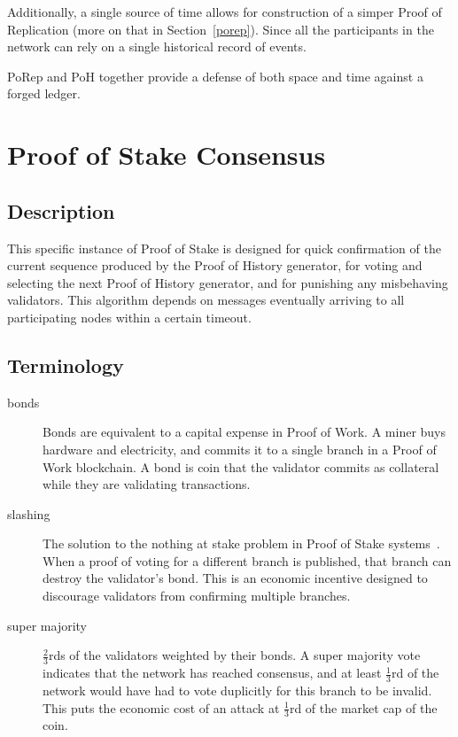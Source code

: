 \documentclass[12pt]{article}
\begin{document}
Additionally, a single source of time allows for construction of a simper Proof of Replication (more on that in Section~\ref{porep}). Since all the participants in the network can rely on a single historical record of events.

PoRep and PoH together provide a defense of both space and time against a forged ledger.


\section{Proof of Stake Consensus}\label{proof_of_stake}
\subsection{Description}
This specific instance of Proof of Stake is designed for quick confirmation of the current sequence produced by the Proof of History generator, for voting and selecting the next Proof of History generator, and for punishing any misbehaving validators. This algorithm depends on messages eventually arriving to all participating nodes within a certain timeout.
\subsection{Terminology}
\begin{description}

\item[bonds]
Bonds are equivalent to a capital expense in Proof of Work. A miner buys hardware and electricity, and commits it to a single branch in a Proof of Work blockchain. A bond is coin that the validator commits as collateral while they are validating transactions.

\item[slashing]

The solution to the nothing at stake problem in Proof of Stake systems~\cite{slasher}.  When a proof of voting for a different branch is published, that branch can destroy the validator's bond.  This is an economic incentive designed to discourage validators from confirming multiple branches.
\item[super majority]
\(\frac{2}{3}\)rds of the validators weighted by their bonds.  A super majority vote indicates that the network has reached consensus, and at least \(\frac{1}{3}\)rd of the network would have had to vote duplicitly for this branch to be invalid.  This puts the economic cost of an attack at \(\frac{1}{3}\)rd of the market cap of the coin.

\end{description}
\end{document}
